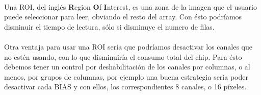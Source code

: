 \paragraph{}
Una ROI, del inglés \textbf{R}egion \textbf{O}f \textbf{I}nterest, es una zona
de la imagen que el usuario puede seleccionar para leer, obviando el resto
del array. Con ésto podríamos disminuir el tiempo de lectura, sólo si
disminuye el numero de filas.

\paragraph{}
Otra ventaja para usar una ROI sería que podríamos desactivar los canales que no
estén usando, con lo que disminuiría el consumo total del chip. Para ésto debemos
tener un control por deshabilitación de los canales por columnas, o al menos, por
grupos de columnas, por ejemplo una buena estrategia sería poder desactivar cada
BIAS y con ellos, los correspondientes 8 canales, o 16 píxeles.
